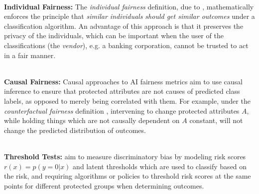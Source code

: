 \documentclass[11pt,dvipdfm]{article}
\begin{document}
\ \\
\noindent \textbf{Individual Fairness:}  The \emph{individual fairness} definition, due to \cite{dwork2012fairness}, mathematically enforces the principle that \emph{similar individuals should get similar outcomes} under a classification algorithm.  An advantage of this approach is that it preserves the privacy of the individuals, which can be important when the user of the classifications (the \emph{vendor}), e.g. a banking corporation, cannot be trusted to act in a fair manner.

\ \\
\noindent \textbf{Causal Fairness:} Causal approaches to AI fairness metrics aim to use causal inference to ensure that protected attributes are not causes of predicted class labels, as opposed to merely being correlated with them.  For example, under the \emph{counterfactual fairness} definition \cite{kusner2017counterfactual}, intervening to change protected attributes $A$, while holding things which are not causally dependent on $A$ constant, will not change the predicted distribution of outcomes.  %

\ \\
\noindent \textbf{Threshold Tests:} \cite{simoiu2017problem} aim to measure discriminatory bias by modeling risk scores $r(x) = p(y=0|x)$ and latent thresholds which are used to classify based on the risk, and requiring algorithms or policies to threshold risk scores at the same points for different protected groups when determining outcomes.
\end{document}
